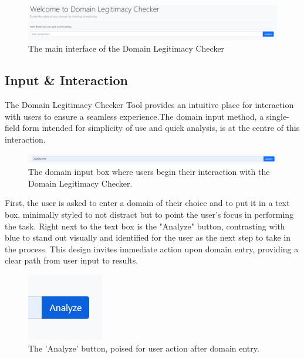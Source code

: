 \begin{figure}[H]
    \centering
    \includegraphics[width=1.1\linewidth]{project/image.png}
    \caption{The main interface of the Domain Legitimacy Checker}
    \label{fig:implem22}
\end{figure}

\subsection{Input \& Interaction}

 The Domain Legitimacy Checker Tool provides an intuitive place for interaction with users to ensure a seamless experience.The domain input method, a single-field form intended for simplicity of use and quick analysis, is at the centre of this interaction.
 
\begin{figure} [H]
    \centering
    \includegraphics[width=1.1\linewidth]{project/6.png}
    \caption{The domain input box where users begin their interaction with the Domain Legitimacy Checker.}
    \label{fig:impl2}
\end{figure}

First, the user is asked to enter a domain of their choice and to put it in a text box, minimally styled to not distract but to point the user's focus in performing the task. Right next to the text box is the "Analyze" button, contrasting with blue to stand out visually and identified for the user as the next step to take in the process. This design invites immediate action upon domain entry, providing a clear path from user input to results.

\begin{figure}[H]
    \centering
    \includegraphics[width=0.3\linewidth]{project/8.png}
    \caption{The 'Analyze' button, poised for user action after domain entry.}
    \label{fig:imple2222}
\end{figure}


